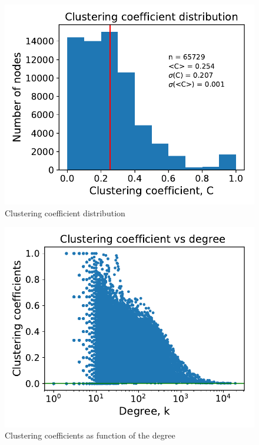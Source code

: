\documentclass[11pt, twoside]{report}
\begin{document}
\begin{minipage}[b]{0.5\textwidth}
   \centering
    \begin{figure}[H]
      \includegraphics[width=\textwidth]{../../scripts/network_analysis/imgs/cluster_coef_hist.pdf}
          \caption{Clustering coefficient distribution}
      \label{fig:clust_distrib}
\end{figure}
\end{minipage}
\begin{minipage}[b]{0.5\textwidth}
  \begin{figure}[H]
  \centering
      \includegraphics[width=\textwidth]{../../scripts/network_analysis/imgs/cluster_coef_bydegree.pdf}
      \caption{Clustering coefficients as function of the degree}
\end{figure}
\end{minipage}
\end{document}
